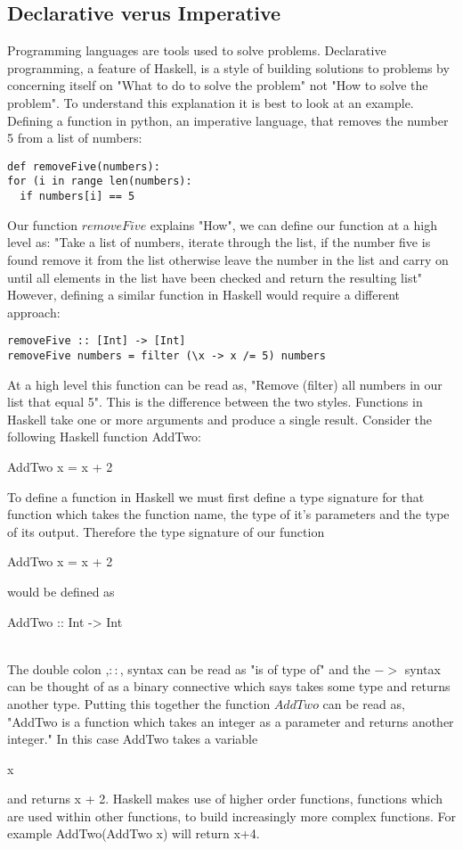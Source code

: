 \documentclass{article}%
\begin{document}
\subsection{Declarative verus Imperative}
Programming languages are tools used to solve problems. Declarative programming, a feature of Haskell, is a style of building solutions to problems by concerning itself on "What to do to solve the problem" not "How to solve the problem". To understand this explanation it is best to look at an example. Defining a function in python, an imperative language, that removes the number 5 from a list of numbers: 
\begin{verbatim}
def removeFive(numbers): 
for (i in range len(numbers): 
  if numbers[i] == 5
\end{verbatim}
Our function $removeFive$ explains "How", we can define our function at a high level as: "Take a list of numbers, iterate through the list, if the number five is found remove it from the list otherwise leave the number in the list and carry on until all elements in the list have been checked and return the resulting list"\\
However, defining a similar function in Haskell would require a different approach:
\begin{verbatim}
removeFive :: [Int] -> [Int]
removeFive numbers = filter (\x -> x /= 5) numbers 
\end{verbatim}
At a high level this function can be read as, "Remove (filter) all numbers in our list that equal 5". This is the difference between the two styles.
Functions in Haskell take one or more arguments and produce a single result. 
Consider the following Haskell function AddTwo: 
\begin{myFunctionStyle}
AddTwo x = x + 2
\end{myFunctionStyle}

To define a function in Haskell we must first define a type signature for that function which takes the function name, the type of it's parameters and the type of its output. Therefore the type signature of our function\begin{myFunctionStyle}
AddTwo x = x + 2
\end{myFunctionStyle} would be defined as \\ \begin{myFunctionStyle}
AddTwo :: Int -> Int 
\end{myFunctionStyle}\\
The double colon ,$::$, syntax can be read as "is of type of" and the $->$ syntax can be thought of as a binary connective which says takes some type and returns another type. Putting this together the function $AddTwo$ can be read as, "AddTwo is a function which takes an integer as a parameter and returns another integer." 
In this case AddTwo takes a variable \begin{myKeyWordStyle}{x}\end{myKeyWordStyle} and returns x + 2.
Haskell makes use of higher order functions, functions which are used within other functions, to build increasingly more complex functions. 
For example AddTwo(AddTwo x) will return x+4. 
\end{document}
